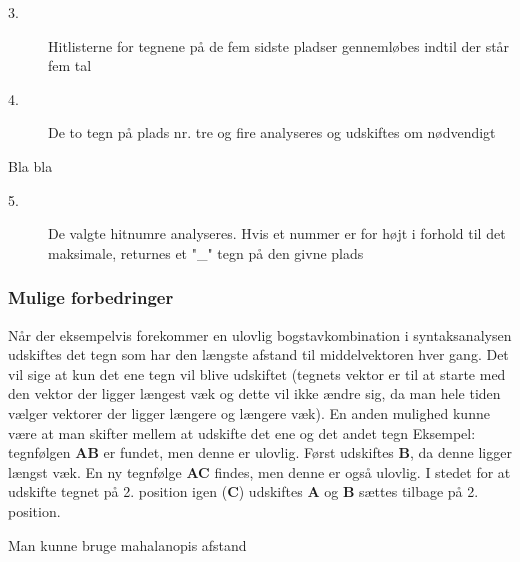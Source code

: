 \begin{description}
\item[3.] Hitlisterne for tegnene på de fem sidste pladser gennemløbes indtil der står fem tal
\item[4.] De to tegn på plads nr. tre og fire analyseres og udskiftes om nødvendigt
\end{description}

Bla bla

\begin{description}
\item[5.] De valgte hitnumre analyseres. Hvis et nummer er for højt i forhold til det maksimale, returnes et "\_" tegn på den givne plads
\end{description}

\subsubsection{Mulige forbedringer}
Når der eksempelvis forekommer en ulovlig bogstavkombination i syntaksanalysen udskiftes det tegn som har den længste afstand til middelvektoren hver gang. Det vil sige at kun det ene tegn vil blive udskiftet (tegnets vektor er til at starte med den vektor der ligger længest væk og dette vil ikke ændre sig, da man hele tiden vælger vektorer der ligger længere og længere væk). En anden mulighed kunne være at man skifter mellem at udskifte det ene og det andet tegn Eksempel: tegnfølgen \textbf{AB} er fundet, men denne er ulovlig. Først udskiftes \textbf{B}, da denne ligger længst væk. En ny tegnfølge \textbf{AC} findes, men denne er også ulovlig. I stedet for at udskifte tegnet på 2. position igen (\textbf{C}) udskiftes \textbf{A} og \textbf{B} sættes tilbage på 2. position.

Man kunne bruge mahalanopis afstand